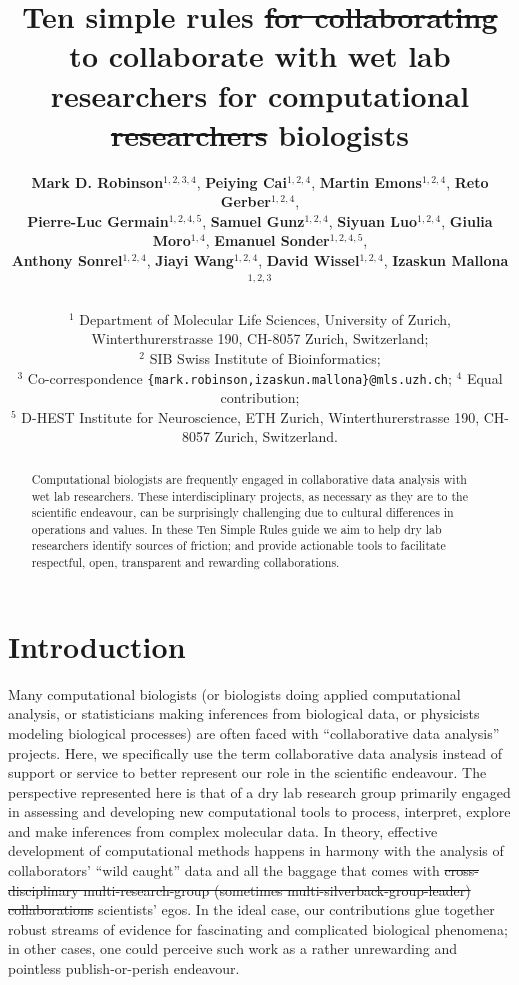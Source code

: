 \documentclass{article}
\title{Ten simple rules {\color{red} \sout{for collaborating} to collaborate} with wet lab researchers for computational {\color{red} \sout{researchers} biologists}}
\author{
\textbf{Mark D. Robinson}$^{1,2,3,4}$, 
\textbf{Peiying Cai}$^{1,2,4}$,
\textbf{Martin Emons}$^{1,2,4}$,
\textbf{Reto Gerber}$^{1,2,4}$,\\
\textbf{Pierre-Luc Germain}$^{1,2,4,5}$,
\textbf{Samuel Gunz$^{1,2,4}$}, 
\textbf{Siyuan Luo$^{1,2,4}$},
\textbf{Giulia Moro$^{1,4}$},
\textbf{Emanuel Sonder$^{1,2,4,5}$},\\
\textbf{Anthony Sonrel$^{1,2,4}$},
\textbf{Jiayi Wang$^{1,2,4}$},
\textbf{David Wissel$^{1,2,4}$},
\textbf{Izaskun Mallona$^{1,2,3}$}\\ 
\\
$^1$ Department of Molecular Life Sciences, University of Zurich, Winterthurerstrasse 190, CH-8057 Zurich, Switzerland;\\ $^2$ SIB Swiss Institute of Bioinformatics;\\ $^3$ Co-correspondence \texttt{\{mark.robinson,izaskun.mallona\}@mls.uzh.ch}; $^4$ Equal contribution;\\
$^5$ D-HEST Institute for Neuroscience, ETH Zurich, Winterthurerstrasse 190, CH-8057 Zurich, Switzerland.\\ 
}
\begin{document}
\maketitle

\vspace{-0.5cm}

\begin{abstract}
Computational biologists are frequently engaged in collaborative data analysis with wet lab researchers. These interdisciplinary projects, as necessary as they are to the scientific endeavour, can be surprisingly challenging due to cultural differences in operations and values. In these Ten Simple Rules guide we aim to help dry lab researchers identify sources of friction; and provide actionable tools to facilitate respectful, open, transparent and rewarding collaborations.
\end{abstract}

\vspace{0.5cm}


\section*{Introduction} %

Many computational biologists (or biologists doing applied computational analysis, or statisticians making inferences from biological data, or physicists modeling biological processes) are often faced with ``collaborative data analysis'' projects. Here, we specifically use the term collaborative data analysis instead of support or service to better represent our role in the scientific endeavour. The perspective represented here is that of a dry lab research group primarily engaged in assessing and developing new computational tools to process, interpret, explore and make inferences from complex molecular data. In theory, effective development of computational methods happens in harmony with the analysis of collaborators’ ``wild caught'' data and all the baggage that comes with {\color{red} \sout{cross-disciplinary multi-research-group (sometimes multi-silverback-group-leader) collaborations} scientists' egos}. In the ideal case, our contributions glue together robust streams of evidence for fascinating and complicated biological phenomena; in other cases, one could perceive such work as a rather unrewarding and pointless publish-or-perish endeavour. 
\end{document}

